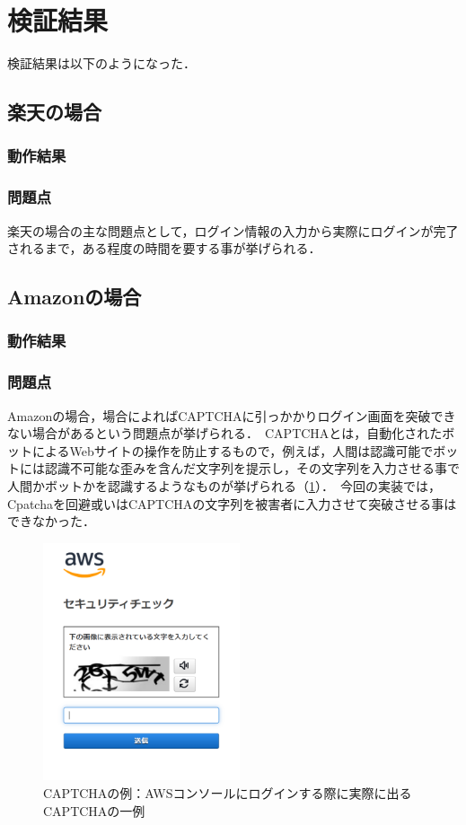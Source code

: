 \documentclass[dvipdfmx]{jsarticle}
\begin{document}
        \section{検証結果}
            検証結果は以下のようになった．
            \subsection{楽天の場合}
                \subsubsection{動作結果}
                \subsubsection{問題点}
                    楽天の場合の主な問題点として，ログイン情報の入力から実際にログインが完了されるまで，ある程度の時間を要する事が挙げられる．\
                    
            \subsection{Amazonの場合}
                \subsubsection{動作結果}
                \subsubsection{問題点}
                    Amazonの場合，場合によればCAPTCHAに引っかかりログイン画面を突破できない場合があるという問題点が挙げられる．\
                    CAPTCHAとは，自動化されたボットによるWebサイトの操作を防止するもので，例えば，人間は認識可能でボットには認識不可能な歪みを含んだ文字列を提示し，その文字列を入力させる事で人間かボットかを認識するようなものが挙げられる（\ref{captcha}）．\
                    今回の実装では，Cpatchaを回避或いはCAPTCHAの文字列を被害者に入力させて突破させる事はできなかった．\
                    \begin{figure}[h]
                        \centering
                        \includegraphics[height=7cm]{img/captcha.png}
                        \caption{CAPTCHAの例：AWSコンソールにログインする際に実際に出るCAPTCHAの一例}
                        \label{captcha}
                    \end{figure}
\end{document}
